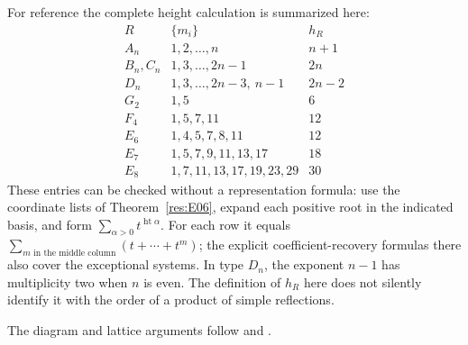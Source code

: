 For reference the complete height calculation is summarized here:
\[
\begin{array}{c|l|c}
 R&\{m_i\}&h_R\\ \hline
 A_n&1,2,\ldots,n&n+1\\
 B_n,C_n&1,3,\ldots,2n-1&2n\\
 D_n&1,3,\ldots,2n-3,\ n-1&2n-2\\
 G_2&1,5&6\\
 F_4&1,5,7,11&12\\
 E_6&1,4,5,7,8,11&12\\
 E_7&1,5,7,9,11,13,17&18\\
 E_8&1,7,11,13,17,19,23,29&30
\end{array}
\]
These entries can be checked without a representation formula:
use the coordinate lists of Theorem~\ref{res:E06}, expand each
positive root in the indicated basis, and form
\(\sum_{\alpha>0}t^{\operatorname{ht}\alpha}\).
For each row it equals
\(\sum_{m\text{ in the middle column}}(t+\cdots+t^m)\);
the explicit coefficient-recovery formulas there also cover
the exceptional systems. In type \(D_n\), the exponent \(n-1\)
has multiplicity two when \(n\) is even.
The definition of \(h_R\) here does not silently identify it
with the order of a product of simple reflections.

The diagram and lattice arguments follow
\cite[Sections 9--13]{humphreys} and
\cite[Sections 21--23 and 32]{etingof}.
